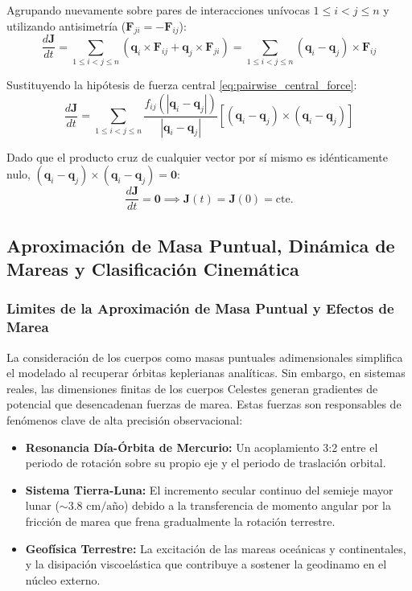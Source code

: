 \documentclass[11pt, a4paper]{article}
\begin{document}
	Agrupando nuevamente sobre pares de interacciones unívocas $1 \le i < j \le n$ y utilizando antisimetría ($\mathbf{F}_{ji} = -\mathbf{F}_{ij}$):
	\begin{equation}
		\frac{d\mathbf{J}}{dt} = \sum_{1 \le i < j \le n} \left( \mathbf{q}_i \times \mathbf{F}_{ij} + \mathbf{q}_j \times \mathbf{F}_{ji} \right) = \sum_{1 \le i < j \le n} (\mathbf{q}_i - \mathbf{q}_j) \times \mathbf{F}_{ij}
	\end{equation}
	
	Sustituyendo la hipótesis de fuerza central \eqref{eq:pairwise_central_force}:
	\begin{equation}
		\frac{d\mathbf{J}}{dt} = \sum_{1 \le i < j \le n} \frac{f_{ij}(|\mathbf{q}_i - \mathbf{q}_j|)}{|\mathbf{q}_i - \mathbf{q}_j|} \left[ (\mathbf{q}_i - \mathbf{q}_j) \times (\mathbf{q}_i - \mathbf{q}_j) \right]
	\end{equation}
	
	Dado que el producto cruz de cualquier vector por sí mismo es idénticamente nulo, $(\mathbf{q}_i - \mathbf{q}_j) \times (\mathbf{q}_i - \mathbf{q}_j) = \mathbf{0}$:
	\begin{equation}
		\frac{d\mathbf{J}}{dt} = \mathbf{0} \implies \mathbf{J}(t) = \mathbf{J}(0) = \text{cte.}
	\end{equation}
	
	\subsection{Aproximación de Masa Puntual, Dinámica de Mareas y Clasificación Cinemática}
	
	\subsubsection{Limites de la Aproximación de Masa Puntual y Efectos de Marea}
	La consideración de los cuerpos como masas puntuales adimensionales simplifica el modelado al recuperar órbitas keplerianas analíticas. Sin embargo, en sistemas reales, las dimensiones finitas de los cuerpos Celestes generan gradientes de potencial que desencadenan fuerzas de marea. Estas fuerzas son responsables de fenómenos clave de alta precisión observacional:
	\begin{itemize}
		\item \textbf{Resonancia Día-Órbita de Mercurio:} Un acoplamiento 3:2 entre el periodo de rotación sobre su propio eje y el periodo de traslación orbital.
		\item \textbf{Sistema Tierra-Luna:} El incremento secular continuo del semieje mayor lunar ($\sim 3.8 \text{ cm/año}$) debido a la transferencia de momento angular por la fricción de marea que frena gradualmente la rotación terrestre.
		\item \textbf{Geofísica Terrestre:} La excitación de las mareas oceánicas y continentales, y la disipación viscoelástica que contribuye a sostener la geodinamo en el núcleo externo.
	\end{itemize}
	
\end{document}
